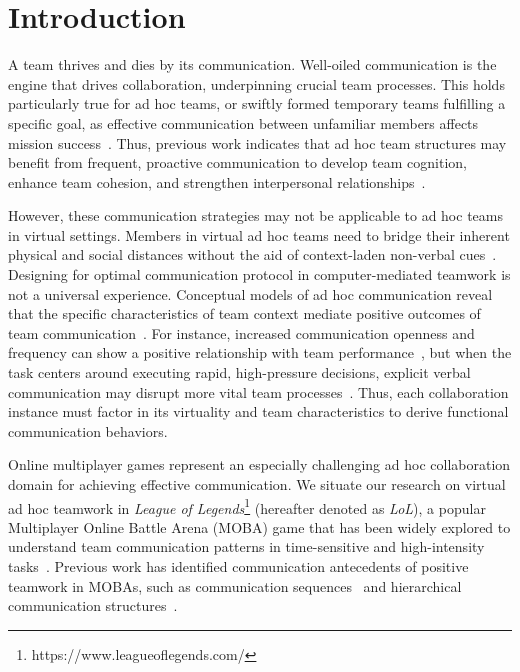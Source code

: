 \section{Introduction}

A team thrives and dies by its communication. Well-oiled communication is the engine that drives collaboration, underpinning crucial team processes. This holds particularly true for ad hoc teams, or swiftly formed temporary teams fulfilling a specific goal, as effective communication between unfamiliar members affects mission success~\cite{white2018, jarvenpaa1998, mesmer2009, marlow2018}. Thus, previous work indicates that ad hoc team structures may benefit from frequent, proactive communication to develop team cognition, enhance team cohesion, and strengthen interpersonal relationships~\cite{capiola2020, strater2008, roberts2014}. 

However, these communication strategies may not be applicable to ad hoc teams in virtual settings. Members in virtual ad hoc teams need to bridge their inherent physical and social distances without the aid of context-laden non-verbal cues~\cite{eisenberg2018, morrison2020}. Designing for optimal communication protocol in computer-mediated teamwork is not a universal experience. Conceptual models of ad hoc communication reveal that the specific characteristics of team context mediate positive outcomes of team communication~\cite{marlow2017}. For instance, increased communication openness and frequency can show a positive relationship with team performance~\cite{mesmer2009, monge2003}, but when the task centers around executing rapid, high-pressure decisions, explicit verbal communication may disrupt more vital team processes~\cite{entin1999, marlow2017}. Thus, each collaboration instance must factor in its virtuality and team characteristics to derive functional communication behaviors.

Online multiplayer games represent an especially challenging ad hoc collaboration domain for achieving effective communication. We situate our research on virtual ad hoc teamwork in \textit{League of Legends}\footnote{https://www.leagueoflegends.com/} (hereafter denoted as \textit{LoL}), a popular Multiplayer Online Battle Arena (MOBA) game that has been widely explored to understand team communication patterns in time-sensitive and high-intensity tasks~\cite{tan2022, zheng2023, leavitt2016, csengun2022players}. Previous work has identified communication antecedents of positive teamwork in MOBAs, such as communication sequences~\cite{tan2022} and hierarchical communication structures~\cite{kim2017}.


